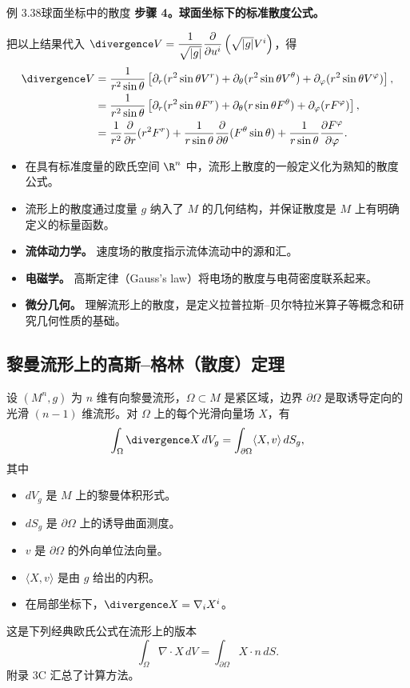 \begin{statement}{例 3.38}{球面坐标中的散度}
\noindent\textbf{步骤 4。球面坐标下的标准散度公式。}\par
把以上结果代入 $\divergence V=\dfrac{1}{\sqrt{|g|}}\dfrac{\partial}{\partial u^i}
  \left(\sqrt{|g|}V^i\right)$，得
\begin{align*}
  \divergence V
  &=\frac{1}{r^2\sin\theta}
  \left[\partial_r(r^2\sin\theta V^r)+\partial_\theta(r^2\sin\theta V^\theta)
            +\partial_\varphi(r^2\sin\theta V^\varphi)\right],\\
  &=\frac{1}{r^2\sin\theta}
  \left[\partial_r(r^2\sin\theta F^r)+\partial_\theta(r\sin\theta F^\theta)
            +\partial_\varphi(r F^\varphi)\right],\\
  &=\frac1{r^2}\frac{\partial}{\partial r}(r^2F^r)
    +\frac{1}{r\sin\theta}\frac{\partial}{\partial\theta}(F^\theta\sin\theta)
    +\frac{1}{r\sin\theta}\frac{\partial F^\varphi}{\partial\varphi}.
\end{align*}
\end{statement}

\begin{itemize}
\item 在具有标准度量的欧氏空间 $\R^n$ 中，流形上散度的一般定义化为熟知的散度公式。
\item 流形上的散度通过度量 $g$ 纳入了 $M$ 的几何结构，并保证散度是 $M$ 上有明确定义的标量函数。
\end{itemize}

\begin{itemize}
\item \textbf{流体动力学。} 速度场的散度指示流体流动中的源和汇。
\item \textbf{电磁学。} 高斯定律（Gauss's law）将电场的散度与电荷密度联系起来。
\item \textbf{微分几何。} 理解流形上的散度，是定义拉普拉斯–贝尔特拉米算子等概念和研究几何性质的基础。
\end{itemize}

\subsection{黎曼流形上的高斯–格林（散度）定理}
设 $(M^n,g)$ 为 $n$ 维有向黎曼流形，$\Omega\subset M$ 是紧区域，边界 $\partial\Omega$ 是取诱导定向的光滑 $(n-1)$ 维流形。对 $\Omega$ 上的每个光滑向量场 $X$，有
\[
  \int_\Omega\divergence X\,dV_g
   =\int_{\partial\Omega}\langle X,v\rangle\,dS_g,
\]
其中
\begin{itemize}
\item $dV_g$ 是 $M$ 上的黎曼体积形式。
\item $dS_g$ 是 $\partial\Omega$ 上的诱导曲面测度。
\item $v$ 是 $\partial\Omega$ 的外向单位法向量。
\item $\langle X,v\rangle$ 是由 $g$ 给出的内积。
\item 在局部坐标下，$\divergence X=\nabla_iX^i$。
\end{itemize}
这是下列经典欧氏公式在流形上的版本
\[
  \int_\Omega\nabla\cdot X\,dV=\int_{\partial\Omega}X\cdot n\,dS.
\]
附录 3C 汇总了计算方法。


